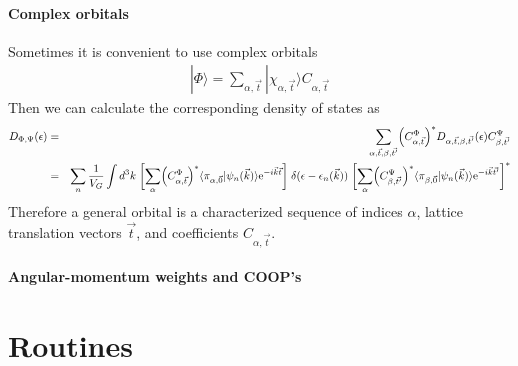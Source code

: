 \documentclass[11pt,a4paper]{report}
\begin{document}
\subsubsection{Complex orbitals}
Sometimes it is convenient to use complex orbitals
\begin{eqnarray}
|\Phi\rangle=\sum_{\alpha,\vec{t}}|\chi_{\alpha,\vec{t}}\rangle C_{\alpha,\vec{t}}
\end{eqnarray}
Then we can calculate the corresponding density of states
as
\begin{eqnarray}
D_{\Phi,\Psi}(\epsilon)
&=&\sum_{\alpha,\vec{t},\beta,\vec{t'}}
\Bigl(C^\Phi_{\alpha,\vec{t}}\Bigr)^*
D_{\alpha,\vec{t},\beta,\vec{t'}}(\epsilon)
C^\Psi_{\beta,\vec{t'}}
\nonumber\\
&=&
\sum_n\frac{1}{V_G}\int d^3k\; 
\biggl[\sum_\alpha \Bigl(C^\Phi_{\alpha,\vec{t}}\Bigr)^*
\langle\pi_{\alpha,\vec{0}}|\psi_n(\vec{k})\rangle
\mathrm{e}^{-i\vec{k}\vec{t}}
\biggr]
\;\delta(\epsilon-\epsilon_n(\vec{k}))\;
\biggl[\sum_\alpha 
\Bigl(C^\Psi_{\beta,\vec{t'}}\Bigr)^*
\langle\pi_{\beta,\vec{0}}|\psi_n(\vec{k})\rangle
\mathrm{e}^{-i\vec{k}\vec{t'}}
\biggr]^*
\nonumber\\
\end{eqnarray}
Therefore a general orbital is a characterized sequence of indices $\alpha$,
lattice translation vectors $\vec{t}$, and coefficients $C_{\alpha,\vec{t}}$.


\subsubsection{Angular-momentum weights and COOP's}



\chapter{Routines}
\cite{bloechl94_prb50_17953}
\end{document}
